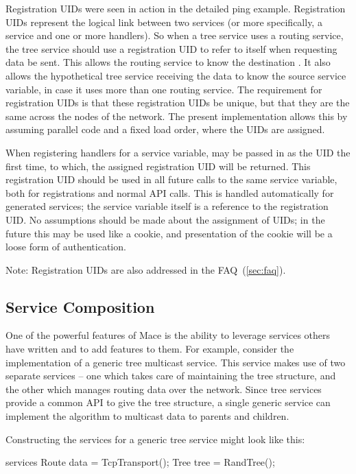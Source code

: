 Registration UIDs were seen in action in the detailed ping example.
Registration UIDs represent the logical link between two services (or
more specifically, a service and one or more handlers).  So when a
tree service uses a routing service, the tree service should use a
registration UID to refer to itself when requesting data be sent.
This allows the routing service to know the destination
.  It also allows the hypothetical tree
service receiving the data to know the source service variable, in
case it uses more than one routing service.  The requirement for
registration UIDs is that these registration UIDs be unique, but that
they are the same across the nodes of the network.  The present
implementation allows this by assuming parallel code and a fixed load
order, where the UIDs are assigned.

When registering handlers for a service variable,  may be
passed in as the UID the first time, to which, the assigned
registration UID will be returned.  This registration UID should be
used in all future calls to the same service variable, both for
registrations and normal API calls.  This is handled automatically for
generated services; the service variable itself is a reference to the
registration UID.  No assumptions should be made about the assignment
of UIDs; in the future this may be used like a cookie, and
presentation of the cookie will be a loose form of authentication.

Note: Registration UIDs are also addressed in the FAQ~(\ref{sec:faq}).

\subsection{Service Composition}
\label{sec:servicecomposition}

One of the powerful features of Mace is the ability to leverage services others
have written and to add features to them.  For example, consider the
implementation of a generic tree multicast service.  This service makes use of
two separate services -- one which takes care of maintaining the tree
structure, and the other which manages routing data over the network.  Since
tree services provide a common API to give the tree structure, a single generic
service can implement the algorithm to multicast data to parents and children.

Constructing the services for a generic tree service might look like this:

\begin{programlisting}
services {
  Route data = TcpTransport();
  Tree tree = RandTree();
}
\end{programlisting}

